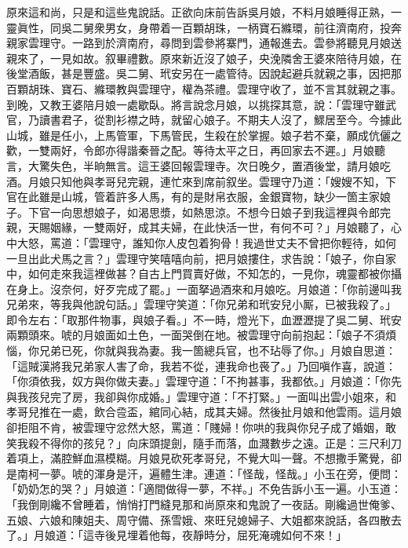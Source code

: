原來這和尚，只是和這些鬼說話。正欲向床前告訴吳月娘，不料月娘睡得正熟，一靈眞性，同吳二舅衆男女，身帶着一百顆胡珠，一柄寶石縧環，前往濟南府，投奔親家雲理守。一路到於濟南府，尋問到雲參將寨門，通報進去。雲參將聽見月娘送親來了，一見如故。叙畢禮數。原來新近沒了娘子，央浼隣舍王婆來陪待月娘，在後堂酒飯，甚是豐盛。吳二舅、玳安另在一處管待。因說起避兵就親之事，因把那百顆胡珠、寶石、縧環教與雲理守，權為茶禮。雲理守收了，並不言其就親之事。到晚，又教王婆陪月娘一處歇臥。將言說念月娘，以挑探其意，說：「雲理守雖武官，乃讀書君子，從割衫襟之時，就留心娘子。{}不期夫人沒了，鰥居至今。今據此山城，雖是任小，上馬管軍，下馬管民，生殺在於掌握。娘子若不棄，願成伉儷之歡，一雙兩好，令郎亦得諧秦晉之配。等待太平之日，再回家去不遲。」月娘聽言，大驚失色，半晌無言。這王婆回報雲理寺。次日晚夕，置酒後堂，請月娘吃酒。月娘只知他與孝哥兒完親，連忙來到席前叙坐。雲理守乃道：「嫂嫂不知，下官在此雖是山城，管着許多人馬，有的是財帛衣服，金銀寶物，缺少一箇主家娘子。下官一向思想娘子，如渴思漿，如熱思涼。不想今日娘子到我這裡與令郎完親，天賜姻緣，一雙兩好，成其夫婦，在此快活一世，有何不可？」月娘聽了，心中大怒，罵道：「雲理守，誰知你人皮包着狗骨！我過世丈夫不曾把你輕待，{}如何一旦出此犬馬之言？」雲理守笑嘻嘻向前，把月娘摟住，求告說：「娘子，你自家中，如何走來我這裡做甚？自古上門買賣好做，不知怎的，一見你，魂靈都被你攝在身上。沒奈何，好歹完成了罷。」一面拏過酒來和月娘吃。月娘道：「你前邊叫我兄弟來，等我與他說句話。」雲理守笑道：「你兄弟和玳安兒小厮，已被我殺了。」即令左右：「取那件物事，與娘子看。」不一時，燈光下，血瀝瀝提了吳二舅、玳安兩顆頭來。唬的月娘面如土色，一面哭倒在地。被雲理守向前抱起：「娘子不須煩惱，你兄弟已死，你就與我為妻。我一箇總兵官，也不玷辱了你。」月娘自思道：「這賊漢將我兄弟家人害了命，我若不從，連我命也䘮了。」乃回嗔作喜，說道：「你須依我，奴方與你做夫妻。」雲理守道：「不拘甚事，我都依。」月娘道：「你先與我孩兒完了房，我卻與你成婚。」雲理守道：「不打緊。」一面叫出雲小姐來，和孝哥兒推在一處，飲合卺盃，綰同心結，成其夫婦。然後扯月娘和他雲雨。這月娘卻拒阻不肯，被雲理守忿然大怒，罵道：「賤婦！你哄的我與你兒子成了婚姻，敢笑我殺不得你的孩兒？」向床頭提劍，隨手而落，血濺數步之遠。正是：三尺利刀着項上，滿腔鮮血濕模糊。月娘見砍死孝哥兒，不覺大叫一聲。不想撒手驚覺，卻是南柯一夢。唬的渾身是汗，遍體生津。連道：「怪哉，怪哉。」小玉在旁，便問：「奶奶怎的哭？」月娘道：「適間做得一夢，不祥。」不免告訴小玉一遍。小玉道：「我倒剛纔不曾睡着，悄悄打門縫見那和尚原來和鬼說了一夜話。剛纔過世俺爹、五娘、六娘和陳姐夫、周守備、孫雪娥、來旺兒媳婦子、大姐都來說話，各四散去了。」月娘道：「這寺後見埋着他每，夜靜時分，屈死淹魂如何不來！」

